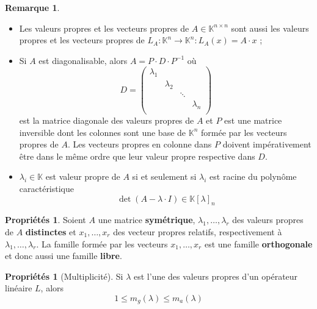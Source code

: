 \documentclass[11pt,a4paper]{article}
\theoremstyle{definition}
\newtheorem{myprop}[mydef]{Propriétés}
\newtheorem{myrem}[mydef]{Remarque}
\DeclareMathOperator{\newdet}{det}
\newcommand{\K}{\mathbb{K}}
\newcommand{\Kn}{\K^n}
\newcommand{\Knn}{\K^{n \times n}}
\newcommand*\InsertTheoremBreak{%
	\begingroup %
		\setlength\itemsep{0pt}%
		\setlength\parsep{0pt}%
		\item[\vbox{\null}]%
	\endgroup%
}%
\begin{document}
\begin{myrem}
	\InsertTheoremBreak
	\begin{itemize}
		\item Les valeurs propres et les vecteurs propres de $A \in \Knn$ sont aussi les valeurs propres et les vecteurs propres de $L_A : \Kn \rightarrow \Kn : L_A(x) = A \cdot x$ ;
		\item Si $A$ est diagonalisable, alors
			$A = P\cdot D \cdot P^{-1}$ où
			\[
			D = \begin{pmatrix} \lambda_1 &  &  &  \\
				& \lambda_2 &  & \\
				& & \ddots & \\
				& & & \lambda_n \\
			\end{pmatrix}
			\]
			est la matrice diagonale des valeurs propres de $A$
			et $P$ est une matrice inversible dont les colonnes sont une base de $\Kn$ formée par les vecteurs propres de $A$.
			Les vecteurs propres en colonne dans $P$ doivent impérativement être dans le même ordre que leur valeur propre respective dans $D$.
		\item $\lambda_i \in \K$ est valeur propre de $A$ si et seulement si $\lambda_i$ est racine du polynôme caractéristique
			\[ \newdet (A - \lambda \cdot I) \in \K[\lambda]_n \]
	\end{itemize}
\end{myrem}

\begin{myprop}
	Soient $A$ une matrice \textbf{symétrique},
	$\lambda_1, \dots, \lambda_r$ des valeurs propres de $A$ \textbf{distinctes}
	et $x_1, \dots, x_r$ des vecteur propres relatifs, respectivement à $\lambda_1, \dots, \lambda_r$.
	La famille formée par les vecteurs $x_1, \dots, x_r$ est une famille \textbf{orthogonale} et donc aussi une famille \textbf{libre}.
\end{myprop}

\begin{myprop}[Multiplicité]
	Si $\lambda$ est l'une des valeurs propres d'un opérateur linéaire $L$, alors
	\[ 1 \leq m_g (\lambda) \leq m_a (\lambda) \]
\end{myprop}
\end{document}
